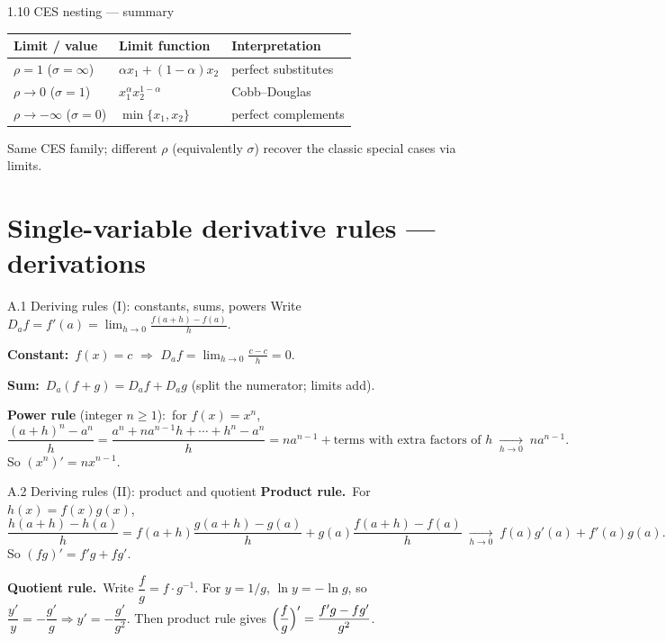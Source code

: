 \documentclass[11pt,aspectratio=169]{beamer}
\begin{document}
\begin{frame}{1.10 CES nesting --- summary}
  \footnotesize
  \begin{center}
  \renewcommand{\arraystretch}{1.25}
  \begin{tabular}{@{}lll@{}}
    \toprule
    Limit / value & Limit function & Interpretation \\
    \midrule
    $\rho=1$ ($\sigma=\infty$) & $\alpha x_1+(1-\alpha)x_2$ & perfect substitutes \\
    $\rho\to 0$ ($\sigma=1$) & $x_1^{\alpha}x_2^{1-\alpha}$ & Cobb--Douglas \\
    $\rho\to-\infty$ ($\sigma=0$) & $\min\{x_1,x_2\}$ & perfect complements \\
    \bottomrule
  \end{tabular}
  \end{center}

  \medskip
  {\scriptsize Same CES family; different $\rho$ (equivalently $\sigma$) recover the
  classic special cases via limits.}
\end{frame}

\appendix

\section{Single-variable derivative rules --- derivations}

\begin{frame}{A.1 Deriving rules (I): constants, sums, powers}
  \small
  Write $D_a f=f'(a)=\displaystyle\lim_{h\to 0}\frac{f(a+h)-f(a)}{h}$.

  \medskip
  \textbf{Constant:}\ $f(x)=c$ $\Rightarrow$
  $D_a f=\displaystyle\lim_{h\to 0}\frac{c-c}{h}=0$.

  \medskip
  \textbf{Sum:}\ $D_a(f+g)=D_a f+D_a g$
  (split the numerator; limits add).

  \medskip
  \textbf{Power rule} (integer $n\ge 1$):\ for $f(x)=x^n$,
  \[
    \frac{(a+h)^n-a^n}{h}
    =\frac{a^n+na^{n-1}h+\cdots+h^n-a^n}{h}
    =na^{n-1}+\text{terms with extra factors of }h
    \;\xrightarrow[h\to 0]{}\; na^{n-1}.
  \]
  So $(x^n)'=nx^{n-1}$.
\end{frame}

\begin{frame}{A.2 Deriving rules (II): product and quotient}
  \small
  \textbf{Product rule.}\ For $h(x)=f(x)g(x)$,
  \[
    \frac{h(a+h)-h(a)}{h}
    =f(a+h)\frac{g(a+h)-g(a)}{h}
     +g(a)\frac{f(a+h)-f(a)}{h}
     \;\xrightarrow[h\to 0]{}\;
     f(a)g'(a)+f'(a)g(a).
  \]
  So $(fg)'=f'g+fg'$.

  \medskip
  \textbf{Quotient rule.}\ Write $\dfrac{f}{g}=f\cdot g^{-1}$.
  For $y=1/g$, $\ln y=-\ln g$, so
  $\dfrac{y'}{y}=-\dfrac{g'}{g}\Rightarrow y'=-\dfrac{g'}{g^2}$.
  Then product rule gives
  $\Bigl(\dfrac{f}{g}\Bigr)'=\dfrac{f'g-fg'}{g^2}$.
\end{frame}
\end{document}
